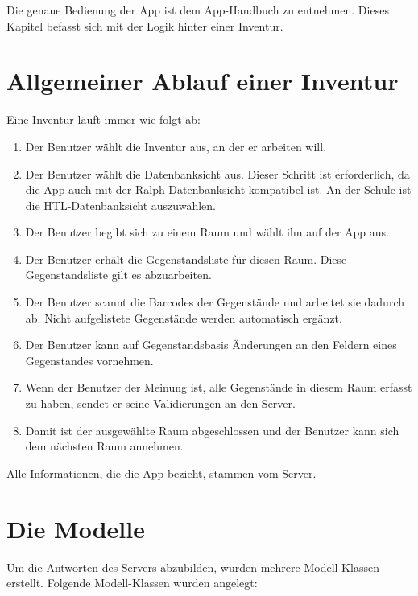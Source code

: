 Die genaue Bedienung der App ist dem App-Handbuch zu entnehmen. Dieses
Kapitel befasst sich mit der Logik hinter einer Inventur.

\hypertarget{allgemeiner-ablauf-einer-inventur}{%
\section{Allgemeiner Ablauf einer
Inventur}\label{allgemeiner-ablauf-einer-inventur}}

Eine Inventur läuft immer wie folgt ab:

\begin{enumerate}
\def\labelenumi{\arabic{enumi}.}
\tightlist
\item
  Der Benutzer wählt die Inventur aus, an der er arbeiten will.
\item
  Der Benutzer wählt die Datenbanksicht aus. Dieser Schritt ist
  erforderlich, da die App auch mit der Ralph-Datenbanksicht kompatibel
  ist. An der Schule ist die HTL-Datenbanksicht auszuwählen.
\item
  Der Benutzer begibt sich zu einem Raum und wählt ihn auf der App aus.
\item
  Der Benutzer erhält die Gegenstandsliste für diesen Raum. Diese
  Gegenstandsliste gilt es abzuarbeiten.
\item
  Der Benutzer scannt die Barcodes der Gegenstände und arbeitet sie
  dadurch ab. Nicht aufgelistete Gegenstände werden automatisch ergänzt.
\item
  Der Benutzer kann auf Gegenstandsbasis Änderungen an den Feldern eines
  Gegenstandes vornehmen.
\item
  Wenn der Benutzer der Meinung ist, alle Gegenstände in diesem Raum
  erfasst zu haben, sendet er seine Validierungen an den Server.
\item
  Damit ist der ausgewählte Raum abgeschlossen und der Benutzer kann
  sich dem nächsten Raum annehmen.
\end{enumerate}

Alle Informationen, die die App bezieht, stammen vom Server.

\hypertarget{die-modelle}{%
\section{Die Modelle}\label{die-modelle}}

Um die Antworten des Servers abzubilden, wurden mehrere Modell-Klassen
erstellt. Folgende Modell-Klassen wurden angelegt:

